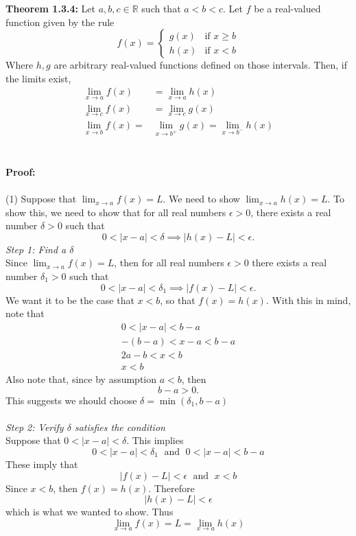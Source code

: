 \documentclass{article}
\begin{document}
	\textbf{Theorem 1.3.4:} Let $a, b, c \in \mathbb{R}$ such that $a < b < c$. Let $f$ be a real-valued function given by the rule
	$$f(x) = \begin{cases}
		g(x) & \text{if } x \geq b \\
		h(x) & \text{if } x < b
	\end{cases}$$ 
	Where $h, g$ are arbitrary real-valued functions defined on those intervals. Then, if the limits exist,
	\begin{align*}
		\lim_{x \to a}{f(x)} &= \lim_{x \to a}{h(x)} \tag{1}\\
		\lim_{x \to c}{f(x)} &= \lim_{x \to c}{g(x)} \tag{2}\\
		\lim_{x \to b}{f(x)} = &\lim_{x \to b^{+}}{g(x)} = \lim_{x \to b^{-}}{h(x)} \tag{3}
	\end{align*}
	\\\\
	\textbf{Proof:} \\\\
	(1) Suppose that $\lim_{x \to a}{f(x)} = L$. We need to show $\lim_{x \to a}{h(x)} = L$. To show this, we need to show that for all real numbers $\epsilon > 0$, there exists a real number $\delta > 0$ such that
	$$0 < |x - a| < \delta \implies |h(x) - L| < \epsilon.$$
	\textit{Step 1: Find a $\delta$} \\
	Since $\lim_{x \to a}{f(x)} = L$, then for all real numbers $\epsilon > 0$ there exists a real number $\delta_1 > 0$ such that
	$$0 < |x - a| < \delta_1 \implies |f(x) - L| < \epsilon.$$
	We want it to be the case that $x < b$, so that $f(x) = h(x)$. With this in mind, note that
	\begin{align*}
		0 < |x - a| < b - a \\
		-(b - a) < x - a < b - a \tag{Abs. Val Ineq. 2}\\
		2a - b < x < b \\
		x < b
	\end{align*}
	Also note that, since by assumption $a < b$, then
	$$b - a > 0.$$
	This suggests we should choose $\delta = \min{(\delta_1, b - a)}$ \\\\
	\textit{Step 2: Verify $\delta$ satisfies the condition} \\
	Suppose that $0 < |x - a| < \delta$. This implies
	$$0 < |x - a| < \delta_1 \; \text{ and } \; 0 < |x - a| < b - a$$
	These imply that
	$$|f(x) - L| < \epsilon \; \text{ and } \; x < b$$
	Since $x < b$, then $f(x) = h(x)$. Therefore
	$$|h(x) - L| < \epsilon$$
	which is what we wanted to show. Thus
	$$\lim_{x \to a}{f(x)} = L = \lim_{x \to a}{h(x)}$$ \\\\
	
\end{document}
